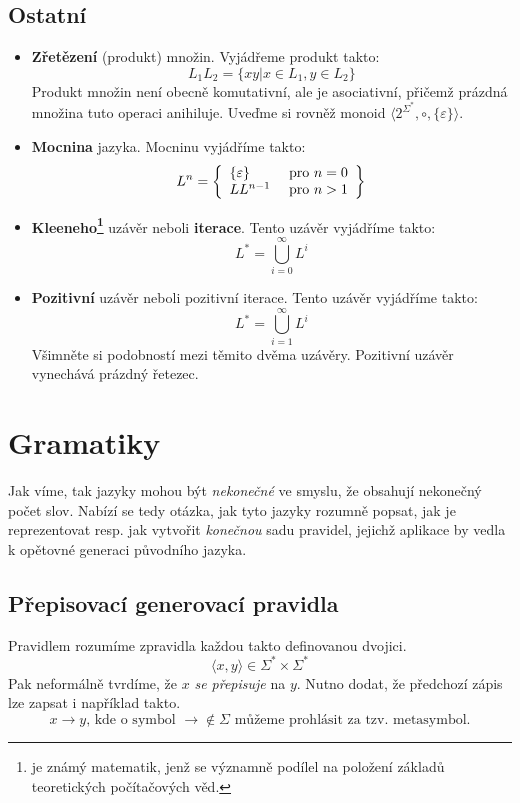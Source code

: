 \documentclass[10pt, a4paper, titlepage]{article}
\theoremstyle{note}
\begin{document}
\subsection{Ostatní}
\begin{itemize}
\item
\textbf{Zřetězení} (produkt) množin. Vyjádřeme produkt takto:
$$
L_{1}L_{2} = \lbrace xy | x \in L_{1}, y \in L_{2} \rbrace
$$
Produkt množin není obecně komutativní, ale je asociativní, přičemž prázdná množina tuto operaci anihiluje.
Uveďme si rovněž monoid $\langle 2^{\Sigma^{*}}, \circ, \lbrace \varepsilon \rbrace \rangle$.

\item
\textbf{Mocnina} jazyka. Mocninu vyjádříme takto:
$$
L^{n} = \left\lbrace
\begin{array}{l l}
\lbrace \varepsilon \rbrace & \text{ pro } n = 0 \\
LL^{n-1} & \text{ pro } n > 1 \\
\end{array}
\right\rbrace
$$

\item
\textbf{Kleeneho\footnote{ je známý matematik, jenž se významně podílel na položení základů teoretických počítačových věd.}} uzávěr neboli \textbf{iterace}. Tento uzávěr vyjádříme takto:
$$
L^{*} = \bigcup_{i = 0}^{\infty} L^{i}
$$

\item
\textbf{Pozitivní} uzávěr neboli pozitivní iterace. Tento uzávěr vyjádříme takto:
$$
L^{*} = \bigcup_{i = 1}^{\infty} L^{i}
$$
Všimněte si podobností mezi těmito dvěma uzávěry. Pozitivní uzávěr vynechává prázdný řetezec.

\end{itemize}

\section{Gramatiky}
Jak víme, tak jazyky mohou být \emph{nekonečné} ve smyslu, že obsahují nekonečný počet slov.
Nabízí se tedy otázka, jak tyto jazyky rozumně popsat, jak je reprezentovat resp. jak vytvořit \emph{konečnou}
sadu pravidel, jejichž aplikace by vedla k opětovné generaci původního jazyka.

\subsection{Přepisovací generovací pravidla}
Pravidlem rozumíme zpravidla každou takto definovanou dvojici.
$$
\langle x,y \rangle \in \Sigma^{*} \times \Sigma^{*}
$$
Pak neformálně tvrdíme, že $x$ \emph{se přepisuje} na $y$.
Nutno dodat, že předchozí zápis lze zapsat i například takto.
$$
x \rightarrow y\text{, kde o symbol } \rightarrow  \notin \Sigma \text{ můžeme prohlásit za tzv. metasymbol.}
$$
\end{document}
